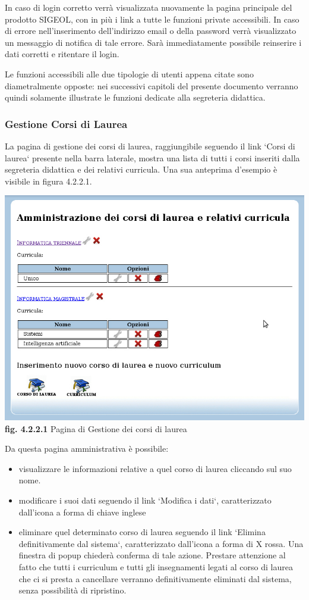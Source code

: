 \documentclass[11pt,a4paper]{article}
\begin{document}
In caso di login corretto verrà visualizzata nuovamente la pagina principale del prodotto SIGEOL, con in più i link a tutte le funzioni private accessibili.
In caso di errore nell'inserimento dell'indirizzo email o della password verrà visualizzato un messaggio di notifica di tale errore.
Sarà immediatamente possibile reinserire i dati corretti e ritentare il login.

Le funzioni accessibili alle due tipologie di utenti appena citate sono diametralmente opposte: nei successivi capitoli del presente documento verranno quindi solamente illustrate le funzioni dedicate alla segreteria didattica.
\subsubsection{Gestione Corsi di Laurea}
La pagina di gestione dei corsi di laurea, raggiungibile seguendo il link `Corsi di laurea` presente nella barra laterale, mostra una lista di tutti i corsi inseriti dalla segreteria didattica e dei relativi curricula. Una sua anteprima d'esempio è visibile in figura 4.2.2.1.
\bigskip
\begin{center}
	\includegraphics[scale=0.5]{images/corsi_di_laurea.jpg}\\
	\textbf{fig. 4.2.2.1} Pagina di Gestione dei corsi di laurea\\
\end{center}
\bigskip

Da questa pagina amministrativa è possibile:
\begin{itemize}
 \item visualizzare le informazioni relative a quel corso di laurea cliccando sul suo nome.
 \item modificare i suoi dati seguendo il link `Modifica i dati`, caratterizzato dall'icona a forma di chiave inglese
 \item eliminare quel determinato corso di laurea seguendo il link `Elimina definitivamente dal sistema`, caratterizzato dall'icona a forma di X rossa. Una finestra di popup chiederà conferma di tale azione. Prestare attenzione al fatto che tutti i curriculum e tutti gli insegnamenti legati al corso di laurea che ci si presta a cancellare verranno definitivamente eliminati dal sistema, senza possibilità di ripristino.
\end{itemize}
\end{document}
